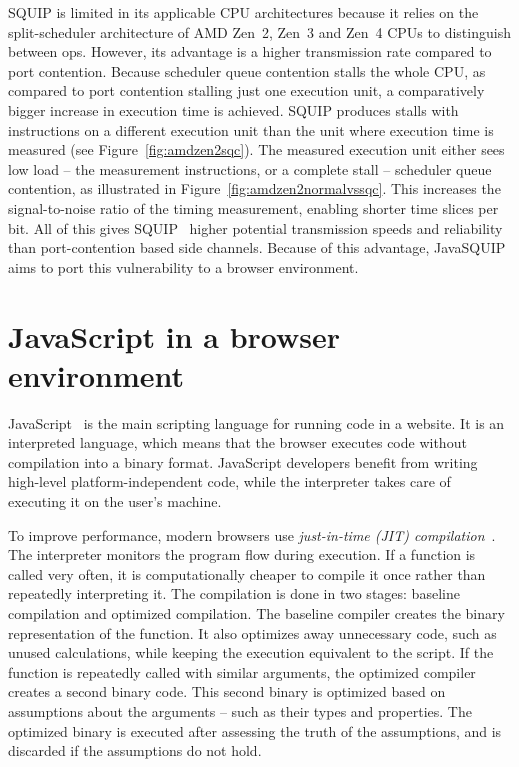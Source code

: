 \documentclass[11pt,
  titlepage=false,
  parskip=half,      %
]{scrreprt}
\begin{document}
SQUIP is limited in its applicable CPU architectures because it relies on the split-scheduler architecture of AMD Zen~2, Zen~3 and Zen~4 CPUs to distinguish between \textmu ops.
However, its advantage is a higher transmission rate compared to port contention.
Because scheduler queue contention stalls the whole CPU, as compared to port contention stalling just one execution unit,
a comparatively bigger increase in execution time is achieved.
SQUIP produces stalls with instructions on a different execution unit than the unit where execution time is measured (see Figure~\ref{fig:amdzen2sqc}).
The measured execution unit either sees low load -- the measurement instructions, or a complete stall -- scheduler queue contention,
as illustrated in Figure~\ref{fig:amdzen2normalvssqc}.
This increases the signal-to-noise ratio of the timing measurement,
enabling shorter time slices per bit.
All of this gives SQUIP~\cite{squip} higher potential transmission speeds and reliability than port-contention based side channels.
Because of this advantage, JavaSQUIP aims to port this vulnerability to a browser environment.

\section{JavaScript in a browser environment}
\label{sec:javascriptenv}
JavaScript~\cite{javascript} is the main scripting language for running code in a website.
It is an interpreted language, which means that the browser executes code without compilation into a binary format.
JavaScript developers benefit from writing high-level platform-independent code,
while the interpreter takes care of executing it on the user's machine.

To improve performance, modern browsers use \textit{just-in-time (JIT) compilation}~\cite{jitcompiler}.
The interpreter monitors the program flow during execution.
If a function is called very often,
it is computationally cheaper to compile it once rather than repeatedly interpreting it.
The compilation is done in two stages: baseline compilation and optimized compilation.
The baseline compiler creates the binary representation of the function.
It also optimizes away unnecessary code, such as unused calculations, while keeping the execution equivalent to the script.
If the function is repeatedly called with similar arguments, the optimized compiler creates a second binary code.
This second binary is optimized based on assumptions about the arguments -- such as their types and properties.
The optimized binary is executed after assessing the truth of the assumptions, and is discarded if the assumptions do not hold.
\end{document}
